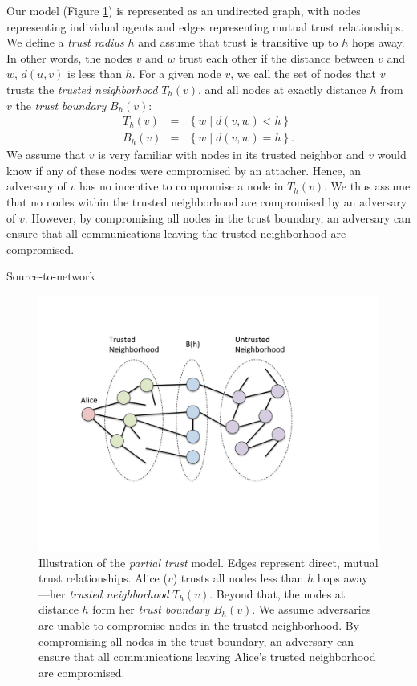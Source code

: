 \documentclass[prodmode,permissions]{acmsmall-ec16}
\newcommand{\beq}{\begin{eqnarray}}
\newcommand{\eeq}{\end{eqnarray}}
\begin{document}
Our model (Figure \ref{fig:trust-source})
is represented as an undirected graph,
with nodes representing individual
agents and edges representing mutual trust relationships.
We define a {\em trust radius} $h$ and assume that trust is transitive
up to $h$ hops away.
In other words, the nodes $v$ and $w$ trust each other if the distance between $v$ and $w$, $d(u,v)$ is less than $h$.
For a given node $v$, we call the set of nodes that $v$ trusts the {\em trusted neighborhood} $T_h(v)$,
and all nodes at exactly distance $h$ from $v$ the {\em trust boundary} $B_h(v)$:
\beq
T_h(v) &=& \left\{ w \mid d(v,w) < h \right\} \\
B_h(v) &=& \left\{ w \mid d(v,w) = h \right\}.
\eeq
We assume that $v$ is very familiar with nodes in its trusted neighbor and $v$ would know if any of these nodes were compromised by an attacher. Hence, an adversary of $v$ has no incentive to compromise a node in  $T_h(v)$. We thus assume that no nodes within the trusted neighborhood are compromised
by an adversary of $v$. However, by compromising all nodes in the trust boundary, an adversary can
ensure that all communications leaving the trusted neighborhood are compromised. 

Source-to-network
\begin{figure}
\centerline{\includegraphics[height =.4 \textwidth]{fig-alice_trusted_neigh2}}
\caption{
Illustration of the {\em partial trust} model.
Edges represent direct, mutual trust relationships.
Alice ($v$) trusts all nodes less than
$h$ hops away---her {\em trusted neighborhood} $T_h(v)$.
Beyond that, the nodes at distance $h$ form her {\em trust boundary} $B_h(v)$.
We assume adversaries are unable to compromise nodes in the trusted neighborhood.
By compromising all nodes in the trust boundary, an adversary can ensure that
all communications leaving Alice's trusted neighborhood are compromised.
}
\label{fig:trust-source}
\end{figure}
\end{document}

